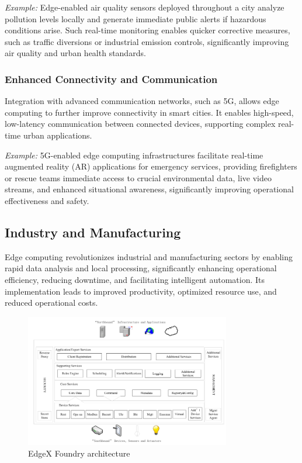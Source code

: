 \documentclass[runningheads]{llncs}
\begin{document}
\noindent\textit{Example:} Edge-enabled air quality sensors deployed throughout a city analyze pollution levels locally and generate immediate public alerts if hazardous conditions arise. Such real-time monitoring enables quicker corrective measures, such as traffic diversions or industrial emission controls, significantly improving air quality and urban health standards.

\subsubsection{Enhanced Connectivity and Communication}
Integration with advanced communication networks, such as 5G, allows edge computing to further improve connectivity in smart cities. It enables high-speed, low-latency communication between connected devices, supporting complex real-time urban applications.

\noindent\textit{Example:} 5G-enabled edge computing infrastructures facilitate real-time augmented reality (AR) applications for emergency services, providing firefighters or rescue teams immediate access to crucial environmental data, live video streams, and enhanced situational awareness, significantly improving operational effectiveness and safety.


\subsection{Industry and Manufacturing}

Edge computing revolutionizes industrial and manufacturing sectors by enabling rapid data analysis and local processing, significantly enhancing operational efficiency, reducing downtime, and facilitating intelligent automation. Its implementation leads to improved productivity, optimized resource use, and reduced operational costs.

\begin{figure}[ht]
    \centering
    \includegraphics[width=0.8\textwidth]{IMG/7.png}
    \caption{EdgeX Foundry architecture}
    \label{fig:edgex_architecture}
    \end{figure}
\FloatBarrier
\end{document}
